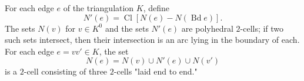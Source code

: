 For each edge $e$ of the triangulation $K$, define
$$N'(e) = \operatorname{Cl}\left[ N(e) - N(\operatorname{Bd} e) \right].$$
The sets $N(v)$ for $v \in K^0$ and the sets $N'(e)$ are polyhedral $2$-cells; if two such sets intersect, then their intersection is an arc lying in the boundary of each. For each edge $e = vv' \in K$, the set
$$N(e) = N(v) \cup N'(e) \cup N(v')$$
is a $2$-cell consisting of three $2$-cells "laid end to end."
